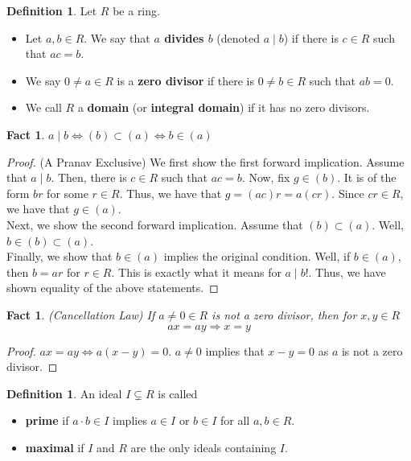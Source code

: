 \documentclass{amsart}
\newtheorem{fact}[thm]{Fact}
\theoremstyle{definition}
\newtheorem{defn}[thm]{Definition}
\theoremstyle{remark}
\begin{document}
\begin{defn}
    Let $R$ be a ring.
    \begin{itemize}
        \item Let $a,b \in R$. We say that \textbf{$a$ divides $b$} (denoted $a \mid b$)
        if there is $c \in R$ such that $ac = b$.
        \item We say $0 \neq a \in R$ is a \textbf{zero divisor} if there is
        $0 \neq b \in R$ such that $ab = 0$.
        \item We call $R$ a \textbf{domain} (or \textbf{integral domain}) if it has
        no zero divisors.
    \end{itemize}
\end{defn}
\begin{fact}
    $a \mid b \iff (b) \subset (a) \iff b \in (a)$
\end{fact}
\begin{proof} (A Pranav Exclusive)
    We first show the first forward implication. Assume that $a \mid b$. Then, there is
    $c \in R$ such that $ac = b$. Now, fix $g \in (b)$. It is of the form $br$ for some
    $r \in R$. Thus, we have that $g = (ac)r = a(cr)$. Since $cr \in R$, we have that $g \in (a)$. \\
    Next, we show the second forward implication. Assume that $(b) \subset (a)$. Well,
    $b \in (b) \subset (a)$. \\
    Finally, we show that $b \in (a)$ implies the original condition. Well, if $b \in (a)$, then
    $b = ar$ for $r \in R$. This is exactly what it means for $a \mid b$!. Thus, we have
    shown equality of the above statements.
\end{proof}
\begin{fact} (Cancellation Law) If $a \neq 0 \in R$ is not a zero divisor, then
    for $x,y \in R$
    $$
    ax = ay \Rightarrow x = y
    $$
\end{fact}
\begin{proof}
    $ax = ay \iff a(x - y) = 0$. $a \neq 0$ implies that $x - y = 0$ as $a$ is not
    a zero divisor.
\end{proof}
\begin{defn}
    An ideal $I \subsetneq R$ is called
    \begin{itemize}
        \item \textbf{prime} if $a \cdot b \in I$ implies $a \in I$ or $b \in I$ for all $a,b \in R$.
        \item \textbf{maximal} if $I$ and $R$ are the only ideals containing $I$.
    \end{itemize}
\end{defn}
\end{document}
